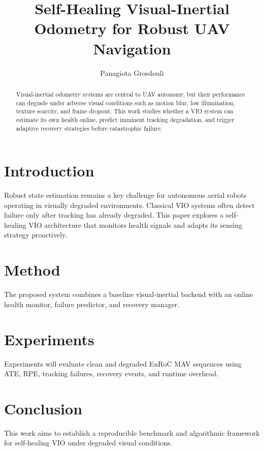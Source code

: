 \documentclass[conference]{IEEEtran}
\title{Self-Healing Visual-Inertial Odometry for Robust UAV Navigation}
\author{Panagiota Grosdouli}
\begin{document}
\maketitle

\begin{abstract}
Visual-inertial odometry systems are central to UAV autonomy, but their performance can degrade under adverse visual conditions such as motion blur, low illumination, texture scarcity, and frame dropout. This work studies whether a VIO system can estimate its own health online, predict imminent tracking degradation, and trigger adaptive recovery strategies before catastrophic failure.
\end{abstract}

\section{Introduction}

Robust state estimation remains a key challenge for autonomous aerial robots operating in visually degraded environments. Classical VIO systems often detect failure only after tracking has already degraded. This paper explores a self-healing VIO architecture that monitors health signals and adapts its sensing strategy proactively.

\section{Method}

The proposed system combines a baseline visual-inertial backend with an online health monitor, failure predictor, and recovery manager.

\section{Experiments}

Experiments will evaluate clean and degraded EuRoC MAV sequences using ATE, RPE, tracking failures, recovery events, and runtime overhead.

\section{Conclusion}

This work aims to establish a reproducible benchmark and algorithmic framework for self-healing VIO under degraded visual conditions.
\end{document}
